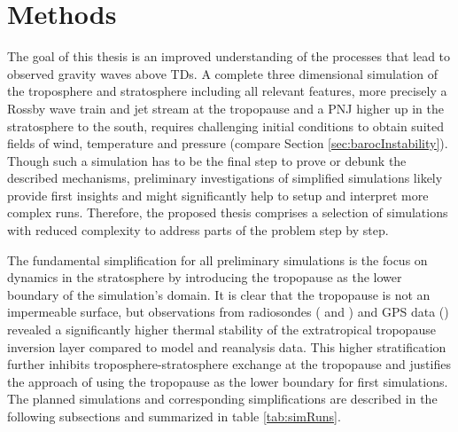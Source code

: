 \section{Methods}
\label{sec:methods}




The goal of this thesis is an improved understanding of the processes that lead to observed gravity waves above TDs. A complete three dimensional simulation of the troposphere and stratosphere including all relevant features, more precisely a Rossby wave train and jet stream at the tropopause and a PNJ higher up in the stratosphere to the south, requires challenging initial conditions to obtain suited fields of wind, temperature and pressure (compare Section \ref{sec:barocInstability}). Though such a simulation has to be the final step to prove or debunk the described mechanisms, preliminary investigations of simplified simulations likely provide first insights and might significantly help to setup and interpret more complex runs. Therefore, the proposed thesis comprises a selection of simulations with reduced complexity to address parts of the problem step by step.

The fundamental simplification for all preliminary simulations is the focus on dynamics in the stratosphere by introducing the tropopause as the lower boundary of the simulation's domain. It is clear that the tropopause is not an impermeable surface, but observations from radiosondes (\cite{birner_how_2002} and \cite{birner_fine-scale_2006}) and GPS data (\cite{randel_extratropical_2007}) revealed a significantly higher thermal stability of the extratropical tropopause inversion layer compared to model and reanalysis data. This higher stratification further inhibits troposphere-stratosphere exchange at the tropopause and justifies the approach of using the tropopause as the lower boundary for first simulations. The planned simulations and corresponding simplifications are described in the following subsections and summarized in table \ref{tab:simRuns}.

